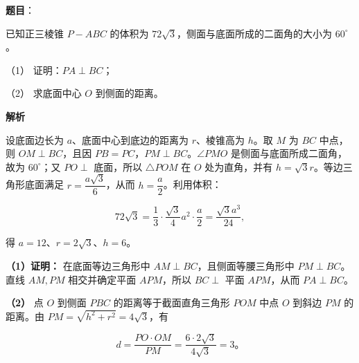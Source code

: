 \begin{answer}

\textbf{题目}：

已知正三棱锥 $P-ABC$ 的体积为 $72\sqrt3$，侧面与底面所成的二面角的大小为 $60^\circ$。

（1） 证明：$PA\perp BC$；

（2） 求底面中心 $O$ 到侧面的距离。
\nopagebreak[4]
\begin{center}\end{center}
\nopagebreak[4]
\textbf{解析}

设底面边长为 $a$、底面中心到底边的距离为 $r$、棱锥高为 $h$。取 $M$ 为 $BC$ 中点，则 $OM\perp BC$，且因 $PB=PC$，$PM\perp BC$。$\angle PMO$ 是侧面与底面所成二面角，故为 $60^\circ$；又 $PO\perp$ 底面，所以 $\triangle POM$ 在 $O$ 处为直角，并有 $h=\sqrt3r$。等边三角形底面满足 $r=\dfrac{a\sqrt3}{6}$，从而 $h=\dfrac a2$。利用体积：

\nopagebreak[4]
\[
72\sqrt3=\frac13\cdot\frac{\sqrt3}{4}a^2\cdot\frac a2
=\frac{\sqrt3a^3}{24},
\]

得 $a=12$、$r=2\sqrt3$、$h=6$。

\textbf{（1）证明：} 在底面等边三角形中 $AM\perp BC$，且侧面等腰三角形中 $PM\perp BC$。直线 $AM,PM$ 相交并确定平面 $APM$，所以 $BC\perp$ 平面 $APM$，从而 $PA\perp BC$。

\textbf{（2）} 点 $O$ 到侧面 $PBC$ 的距离等于截面直角三角形 $POM$ 中点 $O$ 到斜边 $PM$ 的距离。由 $PM=\sqrt{h^2+r^2}=4\sqrt3$，有

\nopagebreak[4]
\[
d=\frac{PO\cdot OM}{PM}=\frac{6\cdot2\sqrt3}{4\sqrt3}=3\mbox{。}
\]



\end{answer}
